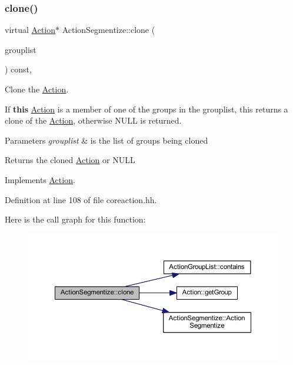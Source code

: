 \subsubsection{\texorpdfstring{clone()}{clone()}}
{\footnotesize\ttfamily virtual \mbox{\hyperlink{class_action}{Action}}$\ast$ Action\+Segmentize\+::clone (\begin{DoxyParamCaption}\item[{const \mbox{\hyperlink{class_action_group_list}{Action\+Group\+List}} \&}]{grouplist }\end{DoxyParamCaption}) const\hspace{0.3cm}{\ttfamily [inline]}, {\ttfamily [virtual]}}



Clone the \mbox{\hyperlink{class_action}{Action}}. 

If {\bfseries{this}} \mbox{\hyperlink{class_action}{Action}} is a member of one of the groups in the grouplist, this returns a clone of the \mbox{\hyperlink{class_action}{Action}}, otherwise N\+U\+LL is returned. 
\begin{DoxyParams}{Parameters}
{\em grouplist} & is the list of groups being cloned \\
\hline
\end{DoxyParams}
\begin{DoxyReturn}{Returns}
the cloned \mbox{\hyperlink{class_action}{Action}} or N\+U\+LL 
\end{DoxyReturn}


Implements \mbox{\hyperlink{class_action_af8242e41d09e5df52f97df9e65cc626f}{Action}}.



Definition at line 108 of file coreaction.\+hh.

Here is the call graph for this function\+:
\nopagebreak
\begin{figure}[H]
\begin{center}
\leavevmode
\includegraphics[width=350pt]{class_action_segmentize_a0fd9bb73aa71eefad72a93cde61a288b_cgraph}
\end{center}
\end{figure}
\mbox{\label{class_action_segmentize_a97b99ceaa938b5d08789e2d4e59ae67a}} 
